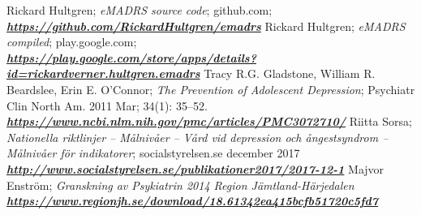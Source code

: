 \documentclass[12pt,a4paper,oneside]{article}
\begin{document}
\begin{thebibliography}{11}
Rickard Hultgren; \emph{eMADRS source code}; github.com; \\\textbf{\emph{\href{https://github.com/RickardHultgren/emadrs}{\url{https://github.com/RickardHultgren/emadrs}}}}
Rickard Hultgren; \emph{eMADRS compiled}; play.google.com; \\\textbf{\emph{\href{https://play.google.com/store/apps/details?id=rickardverner.hultgren.emadrs}{\url{https://play.google.com/store/apps/details?id=rickardverner.hultgren.emadrs}}}}
Tracy R.G. Gladstone, William R. Beardslee, Erin E. O'Connor; \emph{The Prevention of Adolescent Depression}; Psychiatr Clin North Am. 2011 Mar; 34(1): 35--52. \\\textbf{\emph{\href{https://www.ncbi.nlm.nih.gov/pmc/articles/PMC3072710/}{\url{https://www.ncbi.nlm.nih.gov/pmc/articles/PMC3072710/}}}}
Riitta Sorsa; \emph{Nationella riktlinjer -- M\r{a}lniv\r{a}er -- V\r{a}rd vid depression och \r{a}ngestsyndrom -- M\r{a}lniv\r{a}er f{\"o}r indikatorer}; socialstyrelsen.se december 2017\\\textbf{\emph{\href{http://www.socialstyrelsen.se/publikationer2017/2017-12-1}{\url{http://www.socialstyrelsen.se/publikationer2017/2017-12-1}}}}
Majvor Enstr{\"o}m; \emph{Granskning av Psykiatrin 2014 Region J{\"a}mtland-H{\"a}rjedalen}\\\textbf{\emph{\href{https://www.regionjh.se/download/18.61342ea415bcfb51720c5fd7}{\url{https://www.regionjh.se/download/18.61342ea415bcfb51720c5fd7}}}}

\end{thebibliography}
\end{document}
